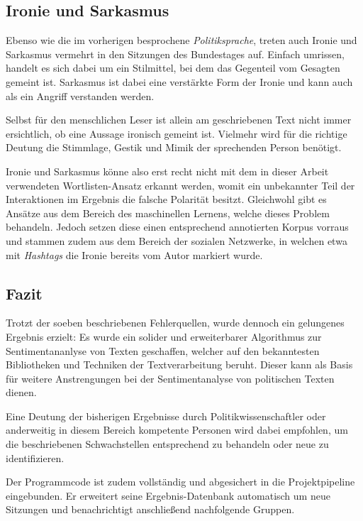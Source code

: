 \subsection{Ironie und Sarkasmus}
Ebenso wie die im vorherigen besprochene \textit{Politiksprache}, treten auch Ironie und Sarkasmus vermehrt in den Sitzungen des Bundestages auf. 
Einfach umrissen, handelt es sich dabei um ein Stilmittel, bei dem das Gegenteil vom Gesagten gemeint ist. 
Sarkasmus ist dabei eine verstärkte Form der Ironie und kann auch als ein Angriff verstanden werden. 

Selbst für den menschlichen Leser ist allein am geschriebenen Text nicht immer ersichtlich, ob eine Aussage ironisch gemeint ist. 
Vielmehr wird für die richtige Deutung die Stimmlage, Gestik und Mimik der sprechenden Person benötigt. 

Ironie und Sarkasmus könne also erst recht nicht mit dem in dieser Arbeit verwendeten Wortlisten-Ansatz erkannt werden, womit ein unbekannter Teil der Interaktionen im Ergebnis die falsche Polarität besitzt. 
Gleichwohl gibt es Ansätze aus dem Bereich des maschinellen Lernens, welche dieses Problem behandeln. 
Jedoch setzen diese einen entsprechend annotierten Korpus vorraus und stammen zudem aus dem Bereich der sozialen Netzwerke, in welchen etwa mit \textit{Hashtags} die Ironie bereits vom Autor markiert wurde. 

\subsection{Fazit}
Trotzt der soeben beschriebenen Fehlerquellen, wurde dennoch ein gelungenes Ergebnis erzielt: 
Es wurde ein solider und erweiterbarer Algorithmus zur Sentimentananlyse von Texten geschaffen, welcher auf den bekanntesten Bibliotheken und Techniken der Textverarbeitung beruht. 
Dieser kann als Basis für weitere Anstrengungen bei der Sentimentanalyse von politischen Texten dienen. 

Eine Deutung der bisherigen Ergebnisse durch Politikwissenschaftler oder anderweitig in diesem Bereich kompetente Personen wird dabei empfohlen, um die beschriebenen Schwachstellen entsprechend zu behandeln oder neue zu identifizieren. 

Der Programmcode ist zudem vollständig und abgesichert in die Projektpipeline eingebunden. 
Er erweitert seine Ergebnis-Datenbank automatisch um neue Sitzungen und benachrichtigt anschließend nachfolgende Gruppen. 
